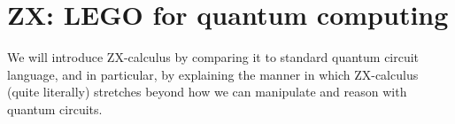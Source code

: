 \documentclass[11pt]{article}
\theoremstyle{definition}
\def\bR{\begin{color}{red}}
\def\e{\end{color}\xspace}
\newcommand{\TODOb}[1]{\marginpar{\scriptsize\bR \textbf{TODO:} #1\e}}
\begin{document}
%
% 
%


\section{ZX: LEGO for quantum computing}\label{sec:ZX}%

We will introduce ZX-calculus by comparing  it  to standard quantum circuit language, and in particular, by explaining the manner  in which ZX-calculus (quite literally) stretches beyond how we can manipulate  and reason with quantum circuits. 
\end{document}
